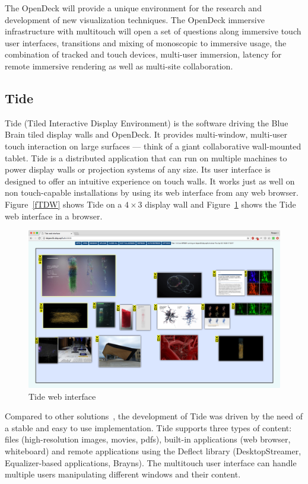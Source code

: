 \documentclass[10pt]{llncs}
\newcommand{\fig}[1]{Figure~\ref{#1}}
\begin{document}
The OpenDeck will provide a unique environment for the research and development
of new visualization techniques. The OpenDeck immersive infrastructure with
multitouch will open a set of questions along immersive touch user interfaces,
transitions and mixing of monoscopic to immersive usage, the combination of
tracked and touch devices, multi-user immersion, latency for remote immersive
rendering as well as multi-site collaboration.

\subsection{Tide}

Tide (Tiled Interactive Display Environment) is the software driving the Blue
Brain tiled display walls and OpenDeck. It provides multi-window, multi-user
touch interaction on large surfaces --- think of a giant collaborative
wall-mounted tablet. Tide is a distributed application that can run on multiple
machines to power display walls or projection systems of any size. Its user
interface is designed to offer an intuitive experience on touch walls. It works
just as well on non touch-capable installations by using its web interface from
any web browser. \fig{fTDW} shows Tide on a $4\times 3$ display wall and
\fig{fTideWeb} shows the Tide web interface in a browser.

\begin{figure}[h!t]
  \includegraphics[width=\columnwidth]{images/tideweb}
  \caption{\label{fTideWeb}Tide web interface}
\end{figure}

Compared to other solutions~\cite{Sage,Sage2,DisplayCluster}, the development of
Tide was driven by the need of a stable and easy to use implementation. Tide
supports three types of content: files (high-resolution images, movies, pdfs),
built-in applications (web browser, whiteboard) and remote applications using
the Deflect library (DesktopStreamer, Equalizer-based applications, Brayns).
The multitouch user interface can handle multiple users manipulating different
windows and their content.
\end{document}
